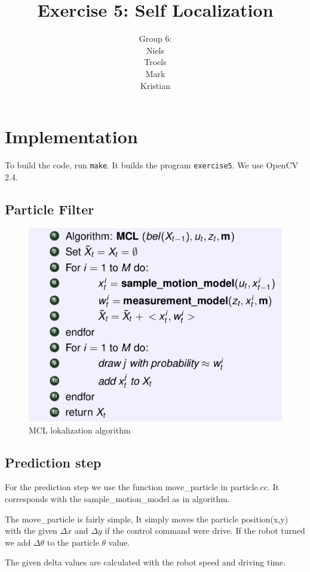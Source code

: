 \documentclass[a4paper,12pt]{article}
\title{Exercise 5: Self Localization}
\author{Group 6:\\Niels\\Troels\\Mark\\Kristian}
\begin{document}
\maketitle
\newpage
\section{Implementation}

To build the code, run \texttt{make}.  It builds the program
\texttt{exercise5}.  We use OpenCV 2.4.


\subsection{Particle Filter}
\begin{figure}[!h]
\centering
\includegraphics[scale=0.50]{MCL.png}
\caption{MCL lokalization algorithm}
\label{MCL}
\end{figure}
\subsection{Prediction step}
For the prediction step we use the function move\_particle in particle.cc. It corresponds with the sample\_motion\_model as in algorithm. 

The move\_particle is fairly simple, It simply moves the particle position(x,y) with the given $\Delta x $ and $\Delta y$ if the control command were drive. If the robot turned we add $\Delta \theta$ to the particle $\theta$ value. 

The given delta values are calculated with the robot speed and driving time. 
\end{document}
